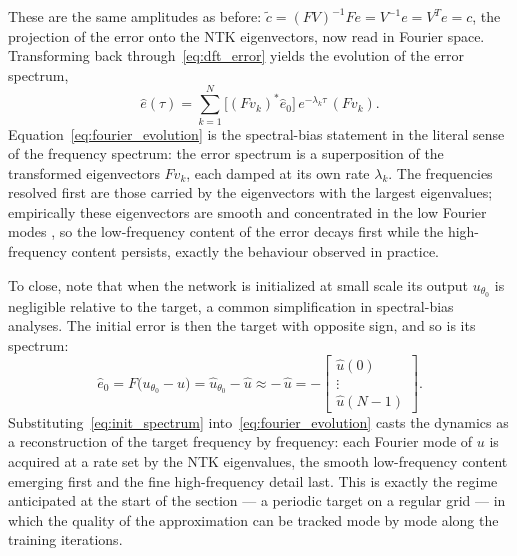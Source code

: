 These are the same amplitudes as before: $\tilde c = (FV)^{-1}F e = V^{-1} e = V^T e = c$, the projection of the error onto the NTK eigenvectors, now read in Fourier space. Transforming back through~\eqref{eq:dft_error} yields the evolution of the error spectrum,
\begin{equation}\label{eq:fourier_evolution}
    \hat e(\tau) = \sum_{k=1}^{N} \bigl[(F v_k)^{*}\hat e_0\bigr]\, e^{-\lambda_k\tau}\,(F v_k).
\end{equation}
Equation~\eqref{eq:fourier_evolution} is the spectral-bias statement in the literal sense of the frequency spectrum: the error spectrum is a superposition of the transformed eigenvectors $F v_k$, each damped at its own rate $\lambda_k$. The frequencies resolved first are those carried by the eigenvectors with the largest eigenvalues; empirically these eigenvectors are smooth and concentrated in the low Fourier modes \parencite{rahaman2019, xu2019frequency}, so the low-frequency content of the error decays first while the high-frequency content persists, exactly the behaviour observed in practice.

To close, note that when the network is initialized at small scale its output $u_{\theta_0}$ is negligible relative to the target, a common simplification in spectral-bias analyses. The initial error is then the target with opposite sign, and so is its spectrum:
\begin{equation}\label{eq:init_spectrum}
    \hat e_0 = F\bigl(u_{\theta_0} - u\bigr) = \hat u_{\theta_0} - \hat u
    \approx -\,\hat u
    = -\begin{bmatrix} \hat u(0) \\ \vdots \\ \hat u(N-1) \end{bmatrix}.
\end{equation}
Substituting~\eqref{eq:init_spectrum} into~\eqref{eq:fourier_evolution} casts the dynamics as a reconstruction of the target frequency by frequency: each Fourier mode of $u$ is acquired at a rate set by the NTK eigenvalues, the smooth low-frequency content emerging first and the fine high-frequency detail last. This is exactly the regime anticipated at the start of the section --- a periodic target on a regular grid --- in which the quality of the approximation can be tracked mode by mode along the training iterations.

